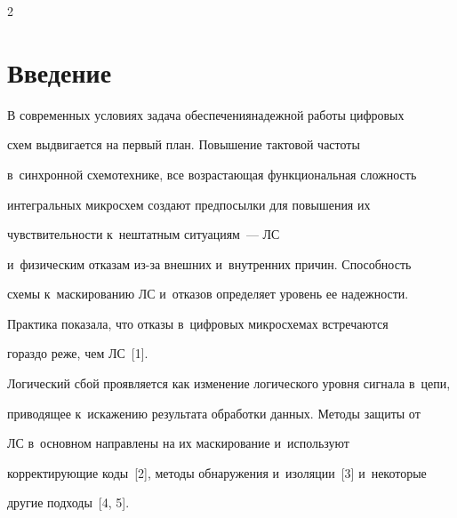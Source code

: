 
  

\vspace*{-3pt}








\thispagestyle{headings}



\begin{multicols}{2}



\label{st\stat}



\section{Введение}



  В современных условиях задача обеспечения\linebreak надежной работы циф\-ро\-вых 

схем выдвигается на первый план. Повышение тактовой частоты 

в~синхронной схемотехнике, все возрастающая функ\-цио\-наль\-ная слож\-ность 

интегральных мик\-ро\-схем создают предпосылки для повышения их 

чув\-ст\-ви\-тель\-ности к~не\-штат\-ным ситуациям~--- ЛС 

и~физическим отказам из-за внеш\-них и~внут\-рен\-них причин. Способ\-ность 

схемы к~маскированию ЛС и~отказов определяет уровень ее на\-деж\-ности. 

Практика показала, что отказы в~циф\-ро\-вых мик\-ро\-схе\-мах встречаются 

гораздо реже, чем ЛС~[1]. 

  

  Логический сбой проявляется как изменение логического уровня сигнала в~цепи, 

приводящее к~искажению результата обработки данных. Методы защиты от 

ЛС в~основном направлены на их маскирование и~используют 

корректирующие коды~[2], методы обнаружения и~изоляции~[3] и~некоторые 

другие подходы~[4, 5]. 

  


\end{multicols}
